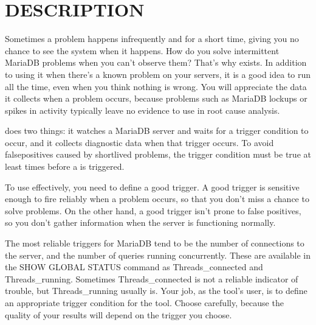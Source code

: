 \documentclass[letterpaper,10pt,english]{sphinxmanual}
\begin{document}
\section{DESCRIPTION}
\label{\detokenize{mariadb-stat:description}}
Sometimes a problem happens infrequently and for a short time, giving you no
chance to see the system when it happens. How do you solve intermittent MariaDB
problems when you can’t observe them? That’s why  exists. In addition to
using it when there’s a known problem on your servers, it is a good idea to run
 all the time, even when you think nothing is wrong.  You will
appreciate the data it collects when a problem occurs, because problems such as
MariaDB lockups or spikes in activity typically leave no evidence to use in root
cause analysis.

 does two things: it watches a MariaDB server and waits for a trigger
condition to occur, and it collects diagnostic data when that trigger occurs.
To avoid false\sphinxhyphen{}positives caused by short\sphinxhyphen{}lived problems, the trigger condition
must be true at least {\hyperref[\detokenize{mariadb-stat:cmdoption-mariadb-stat-cycles}]{}} times before a {\hyperref[\detokenize{mariadb-stat:cmdoption-mariadb-stat-collect}]{}} is triggered.

To use  effectively, you need to define a good trigger.  A good trigger
is sensitive enough to fire reliably when a problem occurs, so that you don’t
miss a chance to solve problems.  On the other hand, a good trigger isn’t
prone to false positives, so you don’t gather information when the server
is functioning normally.

The most reliable triggers for MariaDB tend to be the number of connections to the
server, and the number of queries running concurrently. These are available in
the SHOW GLOBAL STATUS command as Threads\_connected and Threads\_running.
Sometimes Threads\_connected is not a reliable indicator of trouble, but
Threads\_running usually is.  Your job, as the tool’s user, is to define an
appropriate trigger condition for the tool.  Choose carefully, because the
quality of your results will depend on the trigger you choose.
\end{document}
